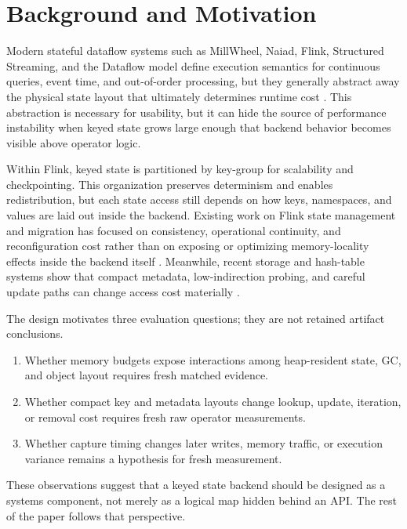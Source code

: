 \documentclass[journal]{IEEEtran}
\begin{document}
\section{Background and Motivation}

Modern stateful dataflow systems such as MillWheel, Naiad, Flink, Structured Streaming, and the Dataflow model define execution semantics for continuous queries, event time, and out-of-order processing, but they generally abstract away the physical state layout that ultimately determines runtime cost \cite{akidau2013millwheel,murray2013naiad,carbone2015flink,akidau2015dataflow,armbrust2018structured}. This abstraction is necessary for usability, but it can hide the source of performance instability when keyed state grows large enough that backend behavior becomes visible above operator logic.

Within Flink, keyed state is partitioned by key-group for scalability and checkpointing. This organization preserves determinism and enables redistribution, but each state access still depends on how keys, namespaces, and values are laid out inside the backend. Existing work on Flink state management and migration has focused on consistency, operational continuity, and reconfiguration cost rather than on exposing or optimizing memory-locality effects inside the backend itself \cite{carbone2017statemanagement,hoffman2019megaphone}. Meanwhile, recent storage and hash-table systems show that compact metadata, low-indirection probing, and careful update paths can change access cost materially \cite{chandramouli2018faster,abseil2018swisstable}.

The design motivates three evaluation questions; they are not retained artifact conclusions.
\begin{enumerate}
\item Whether memory budgets expose interactions among heap-resident state, GC, and object layout requires fresh matched evidence.
\item Whether compact key and metadata layouts change lookup, update, iteration, or removal cost requires fresh raw operator measurements.
\item Whether capture timing changes later writes, memory traffic, or execution variance remains a hypothesis for fresh measurement.
\end{enumerate}

These observations suggest that a keyed state backend should be designed as a systems component, not merely as a logical map hidden behind an API. The rest of the paper follows that perspective.
\end{document}
